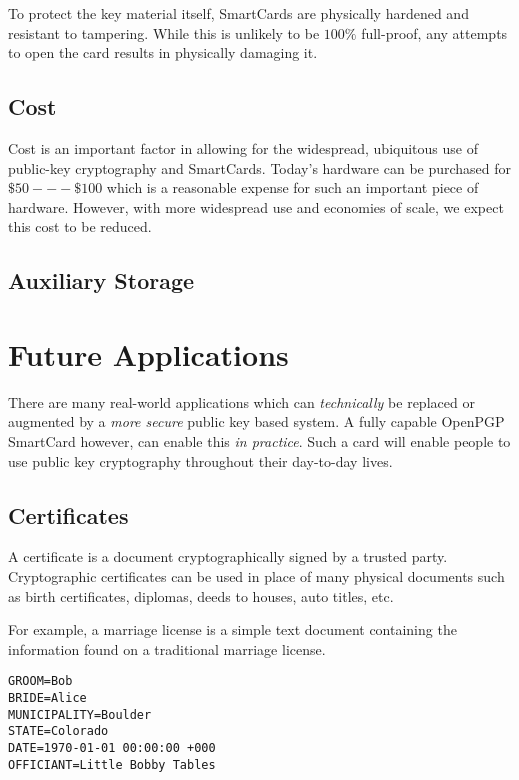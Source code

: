 \documentclass[11pt, twocolumn]{article}
\begin{document}
To protect the key material itself, SmartCards are physically hardened and
resistant to tampering. While this is unlikely to be $100\%$ full-proof, any
attempts to open the card results in physically damaging it.

\subsection{Cost}

Cost is an important factor in allowing for the widespread, ubiquitous use of
public-key cryptography and SmartCards. Today's hardware can be purchased for
$\$50 --- \$100$ which is a reasonable expense for such an important piece of
hardware. However, with more widespread use and economies of scale, we expect
this cost to be reduced.

\subsection{Auxiliary Storage}

\section{Future Applications}
\label{sec:future}

There are many real-world applications which can \textit{technically} be
replaced or augmented by a \textit{more secure} public key based system. A fully
capable OpenPGP SmartCard however, can enable this \textit{in practice}. Such a
card will enable people to use public key cryptography throughout their
day-to-day lives.

\subsection{Certificates}

A certificate is a document cryptographically signed by a trusted party.
Cryptographic certificates can be used in place of many physical documents such
as birth certificates, diplomas, deeds to houses, auto titles, etc.

For example, a marriage license is a simple text document containing the
information found on a traditional marriage license.

\begin{verbatim}
GROOM=Bob
BRIDE=Alice
MUNICIPALITY=Boulder
STATE=Colorado
DATE=1970-01-01 00:00:00 +000
OFFICIANT=Little Bobby Tables
\end{verbatim}
\end{document}
